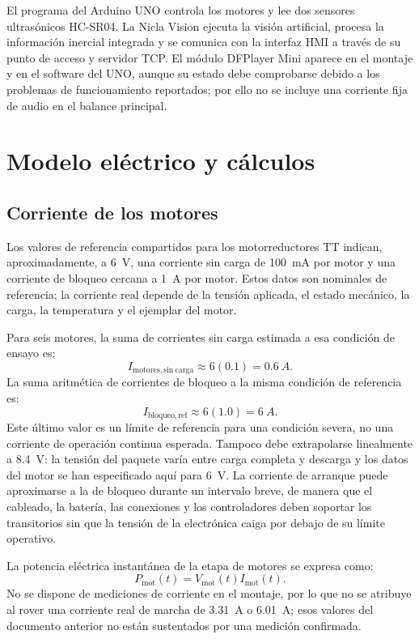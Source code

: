 \documentclass[conference]{IEEEtran}
\begin{document}
El programa del Arduino UNO controla los motores y lee dos sensores ultrasónicos HC-SR04. La Nicla Vision ejecuta la visión artificial, procesa la información inercial integrada y se comunica con la interfaz HMI a través de su punto de acceso y servidor TCP. El módulo DFPlayer Mini aparece en el montaje y en el software del UNO, aunque su estado debe comprobarse debido a los problemas de funcionamiento reportados; por ello no se incluye una corriente fija de audio en el balance principal.

\section{Modelo eléctrico y cálculos}
\subsection{Corriente de los motores}
Los valores de referencia compartidos para los motorreductores TT indican, aproximadamente, a \SI{6}{V}, una corriente sin carga de \SI{100}{mA} por motor y una corriente de bloqueo cercana a \SI{1}{A} por motor. Estos datos son nominales de referencia; la corriente real depende de la tensión aplicada, el estado mecánico, la carga, la temperatura y el ejemplar del motor.

Para seis motores, la suma de corrientes sin carga estimada a esa condición de ensayo es:
\begin{equation}
I_{\mathrm{motores,sin\ carga}}\approx 6(0.1)=\SI{0.6}{A}.
\end{equation}
La suma aritmética de corrientes de bloqueo a la misma condición de referencia es:
\begin{equation}
I_{\mathrm{bloqueo,ref}}\approx 6(1.0)=\SI{6}{A}.
\end{equation}
Este último valor es un límite de referencia para una condición severa, no una corriente de operación continua esperada. Tampoco debe extrapolarse linealmente a \SI{8.4}{V}: la tensión del paquete varía entre carga completa y descarga y los datos del motor se han especificado aquí para \SI{6}{V}. La corriente de arranque puede aproximarse a la de bloqueo durante un intervalo breve, de manera que el cableado, la batería, las conexiones y los controladores deben soportar los transitorios sin que la tensión de la electrónica caiga por debajo de su límite operativo.

La potencia eléctrica instantánea de la etapa de motores se expresa como:
\begin{equation}
P_{\mathrm{mot}}(t)=V_{\mathrm{mot}}(t)I_{\mathrm{mot}}(t).
\end{equation}
No se dispone de mediciones de corriente en el montaje, por lo que no se atribuye al rover una corriente real de marcha de \SI{3.31}{A} o \SI{6.01}{A}; esos valores del documento anterior no están sustentados por una medición confirmada.
\end{document}
